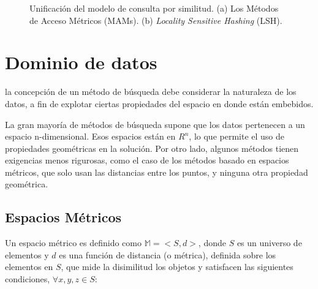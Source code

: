 \begin{figure}[htp]
\centering
{}
\caption{Unificación del modelo de consulta por similitud. (a) Los Métodos de Acceso Métricos (MAMs). (b)  \textit{Locality Sensitive Hashing} (LSH).}
\label{fig:search_model}
\end{figure}


\section{Dominio de datos}

la concepción de un método de búsqueda debe considerar la naturaleza de los datos, a fin de explotar ciertas propiedades del espacio en donde están embebidos.

La gran mayoría de métodos de búsqueda supone que los datos pertenecen a un espacio n-dimensional. Esos espacios están en $R^n$, lo que permite el uso de propiedades geométricas en la solución. Por otro lado, algunos métodos tienen exigencias menos rigurosas, como el caso de los métodos basado en espacios métricos, que solo usan las distancias entre los puntos, y ninguna otra propiedad geométrica.


\subsection{Espacios Métricos}

Un espacio métrico es definido como  $\mathbb{M} = <S, d>$, donde $S$ es un universo de elementos y $d$ es una función de distancia (o métrica), definida sobre los elementos en $S$, que mide la disimilitud los objetos y satisfacen las siguientes condiciones, $\forall x, y, z \in S$:


